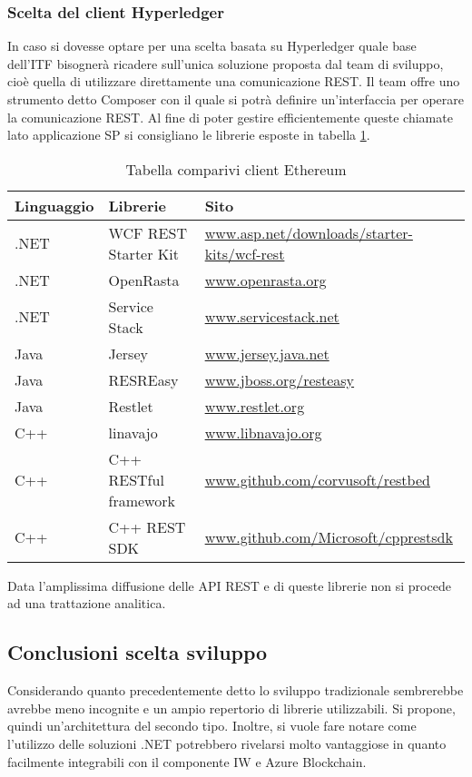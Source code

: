 \subsubsection{Scelta del client Hyperledger}
In caso si dovesse optare per una scelta basata su Hyperledger quale base dell’ITF bisognerà ricadere sull’unica soluzione proposta dal team di sviluppo, cioè quella di utilizzare direttamente una comunicazione REST. Il team offre uno strumento detto Composer con il quale si potrà definire un’interfaccia per operare la comunicazione REST. Al fine di poter gestire efficientemente queste chiamate lato applicazione SP si consigliano le librerie esposte in tabella \ref{tab:comp-client-hyp}.
\begin{table}[!h] %
    \caption{Tabella comparivi client Ethereum}
    \label{tab:comp-client-hyp}
    \begin{tabularx}{\textwidth}{|X|X|X|}
    \hline
    \textbf{Linguaggio} & \textbf{Librerie} & \textbf{Sito}\\
    \hline
    .NET   & WCF REST Starter Kit  & \url{www.asp.net/downloads/starter-kits/wcf-rest} \\
    \hline
    .NET   & OpenRasta & \url{www.openrasta.org} \\
    \hline
    .NET   & Service Stack  & \url{www.servicestack.net} \\
    \hline
    Java  & Jersey & \url{www.jersey.java.net} \\
    \hline
    Java  & RESREasy & \url{www.jboss.org/resteasy}\\
    \hline
    Java  & Restlet & \url{www.restlet.org}\\
    \hline
    C++  & linavajo & \url{www.libnavajo.org}\\
    \hline
    C++  & C++ RESTful framework & \url{www.github.com/corvusoft/restbed}\\
    \hline
    C++  & C++ REST SDK & \url{www.github.com/Microsoft/cpprestsdk}\\
    \hline
    \end{tabularx}
\end{table}%
Data l’amplissima diffusione delle API REST e di queste librerie non si procede ad una trattazione analitica.
\subsection{Conclusioni scelta sviluppo}
Considerando quanto precedentemente detto lo sviluppo tradizionale sembrerebbe avrebbe meno incognite e un ampio repertorio di librerie utilizzabili. Si propone, quindi un’architettura del secondo tipo.
Inoltre, si vuole fare notare come l’utilizzo delle soluzioni .NET potrebbero rivelarsi molto vantaggiose in quanto facilmente integrabili con il componente IW e Azure Blockchain.
